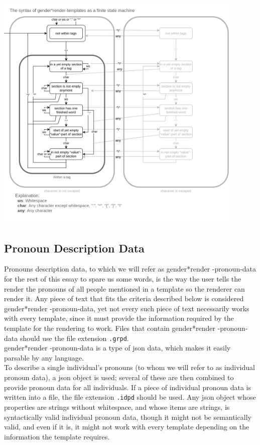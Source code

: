 \documentclass{article}
\newcommand{\GenderRender}{
    gender*render
}
\begin{document}
    \includegraphics[width=12cm]{images/template-as-finite-state-machine.png}

    \subsection{Pronoun Description Data}

     Pronouns description data, to which we will refer as \GenderRender-pronoun-data for the rest of this essay to spare us some words, is the way the user tells the render the pronouns of all people mentioned in a template so the renderer can render it.
     Any piece of text that fits the criteria described below is considered \GenderRender-pronoun-data, yet not every such piece of text necessarily works with every template, since it must provide the information required by the template for the rendering to work.
    Files that contain \GenderRender-pronoun-data should use the file extension \texttt{.grpd}.\\

    \GenderRender-pronoun-data is a type of json data, which makes it easily parsable by any language.\\

    To describe a single individual's pronouns (to whom we will refer to as individual pronoun data), a json object is used;
    several of these are then combined to provide pronoun data for all individuals.
    If a piece of individual pronoun data is written into a file, the file extension \texttt{.idpd} should be used.
    Any json object whose properties are strings without whitespace, and whose items are strings, is syntactically valid individual pronoun data, though it might not be semantically valid, and even if it is, it might not work with every template depending on the information the template requires.\\
\end{document}
